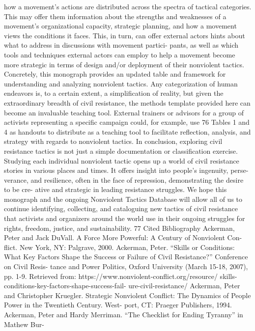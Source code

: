 \documentclass[twoside,a4paper,12pt,fleqn,openany]{extbook}
\begin{document}
how a movement’s actions are distributed across the spectra of tactical categories. This may
offer them information about the strengths and weaknesses of a movement’s organizational
capacity, strategic planning, and how a movement views the conditions it faces. This, in turn,
can offer external actors hints about what to address in discussions with movement partici-
pants, as well as which tools and techniques external actors can employ to help a movement
become more strategic in terms of design and/or deployment of their nonviolent tactics.
Concretely, this monograph provides an updated table and framework for understanding
and analyzing nonviolent tactics. Any categorization of human endeavors is, to a certain
extent, a simplification of reality, but given the extraordinary breadth of civil resistance, the
methods template provided here can become an invaluable teaching tool. External trainers
or advisors for a group of activists representing a specific campaign could, for example, use
76
Tables 1 and 4 as handouts to distribute as a teaching tool to facilitate reflection, analysis,
and strategy with regards to nonviolent tactics.
In conclusion, exploring civil resistance tactics is not just a simple documentation or
classification exercise. Studying each individual nonviolent tactic opens up a world of civil
resistance stories in various places and times. It offers insight into people’s ingenuity, perse-
verance, and resilience, often in the face of repression, demonstrating the desire to be cre-
ative and strategic in leading resistance struggles.
We hope this monograph and the ongoing Nonviolent Tactics Database will allow all of
us to continue identifying, collecting, and cataloguing new tactics of civil resistance that
activists and organizers around the world use in their ongoing struggles for rights, freedom,
justice, and sustainability.
77
Cited Bibliography
Ackerman, Peter and Jack DuVall. A Force
More Powerful: A Century of Nonviolent Con-
flict. New York, NY: Palgrave, 2000.
Ackerman, Peter. “Skills or Conditions: What
Key Factors Shape the Success or Failure of
Civil Resistance?” Conference on Civil Resis-
tance and Power Politics, Oxford University
(March 15-18, 2007), pp. 1-9. Retrieved from:
https://www.nonviolent-conflict.org/resource/
skills-conditions-key-factors-shape-success-fail-
ure-civil-resistance/
Ackerman, Peter and Christopher Kruegler.
Strategic Nonviolent Conflict: The Dynamics of
People Power in the Twentieth Century. West-
port, CT: Praeger Publishers, 1994.
Ackerman, Peter and Hardy Merriman. “The
Checklist for Ending Tyranny” in Mathew Bur-
\end{document}

